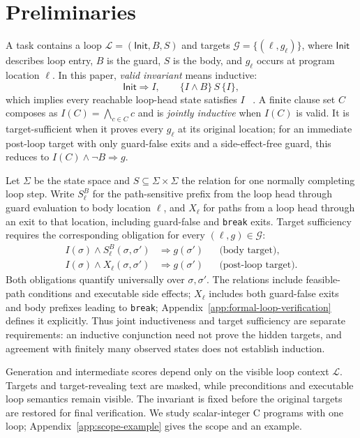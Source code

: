 \section{Preliminaries}\label{sec:preliminaries}

A task contains a loop \(\mathcal L=(\mathsf{Init},B,S)\) and targets
\(\mathcal G=\{(\ell,g_\ell)\}\), where \(\mathsf{Init}\) describes loop entry,
\(B\) is the guard, \(S\) is the body, and \(g_\ell\) occurs at program
location \(\ell\).  In this paper, \emph{valid invariant} means inductive:
\[
  \mathsf{Init}\Rightarrow I,
  \qquad
  \{I\wedge B\}\,S\,\{I\},
\]
which implies every reachable loop-head state satisfies \(I\)
~\citep{floyd1967assigning,hoare1969axiomatic}.  A finite clause set \(C\)
composes as \(I(C)=\bigwedge_{c\in C}c\) and is \emph{jointly inductive} when
\(I(C)\) is valid.  It is target-sufficient when it proves every \(g_\ell\) at
its original location; for an immediate post-loop target with only
guard-false exits and a side-effect-free guard, this reduces to
\(I(C)\wedge\neg B\Rightarrow g\).

Let \(\Sigma\) be the state space and \(S\subseteq\Sigma\times\Sigma\)
the relation for one normally completing loop step.  Write
\(S^B_\ell\) for the path-sensitive prefix from the loop head through
guard evaluation to body location \(\ell\),
and \(X_\ell\) for paths from a loop head through an exit to that location,
including guard-false and \texttt{break} exits.  Target
sufficiency requires the corresponding obligation for every \((\ell,g)\in\mathcal G\):
\begin{align}
 I(\sigma)\land S^B_\ell(\sigma,\sigma')
   &\Rightarrow g(\sigma') &&\text{(body target)},\nonumber\\
 I(\sigma)\land X_\ell(\sigma,\sigma')
   &\Rightarrow g(\sigma') &&\text{(post-loop target)}.
 \label{eq:main-target-obligations}
\end{align}
Both obligations quantify universally over \(\sigma,\sigma'\).
The relations include feasible-path conditions and executable side effects;
\(X_\ell\) includes both guard-false exits and body prefixes leading to
\texttt{break}; Appendix~\ref{app:formal-loop-verification} defines it explicitly.
Thus joint inductiveness and target sufficiency are separate requirements:
an inductive conjunction need not prove the hidden targets, and agreement
with finitely many observed states does not establish induction.

Generation and intermediate scores depend only on the visible loop context
\(\mathcal L\).
Targets and target-revealing text are masked, while preconditions and executable
loop semantics remain visible.  The invariant is fixed before the original
targets are restored for final verification.  We study scalar-integer C
programs with one loop; Appendix~\ref{app:scope-example} gives the scope and an
example.
